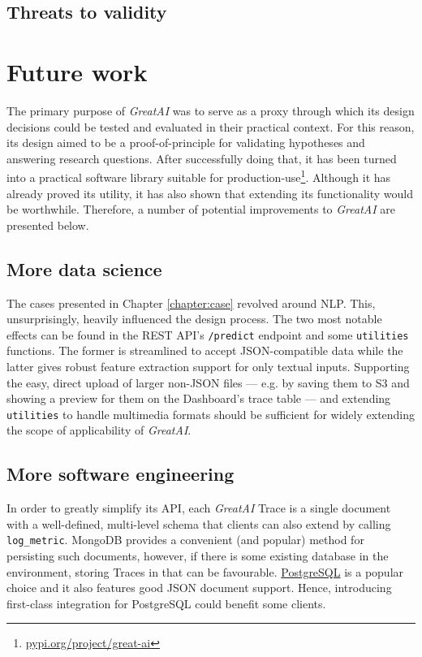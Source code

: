 \subsection{Threats to validity}

\section{Future work} 

The primary purpose of \textit{GreatAI} was to serve as a proxy through which its design decisions could be tested and evaluated in their practical context. For this reason, its design aimed to be a proof-of-principle for validating hypotheses and answering research questions. After successfully doing that, it has been turned into a practical software library suitable for production-use\footnote{\href{https://pypi.org/project/great-ai/}{pypi.org/project/great-ai}}. Although it has already proved its utility, it has also shown that extending its functionality would be worthwhile. Therefore, a number of potential improvements to \textit{GreatAI} are presented below.
 
\subsection{More data science}

The cases presented in Chapter \ref{chapter:case} revolved around NLP. This, unsurprisingly, heavily influenced the design process. The two most notable effects can be found in the REST API's \texttt{/predict} endpoint and some \texttt{utilities} functions. The former is streamlined to accept JSON-compatible data while the latter gives robust feature extraction support for only textual inputs. Supporting the easy, direct upload of larger non-JSON files --- e.g. by saving them to S3 and showing a preview for them on the Dashboard's trace table --- and extending \texttt{utilities} to handle multimedia formats should be sufficient for widely extending the scope of applicability of \textit{GreatAI}.

\subsection{More software engineering}

In order to greatly simplify its API, each \textit{GreatAI} Trace is a single document with a well-defined, multi-level schema that clients can also extend by calling \texttt{log\_metric}. MongoDB provides a convenient (and popular) method for persisting such documents, however, if there is some existing database in the environment, storing Traces in that can be favourable. \href{https://www.postgresql.org/}{PostgreSQL} is a popular choice and it also features good JSON document support. Hence, introducing first-class integration for PostgreSQL could benefit some clients.

